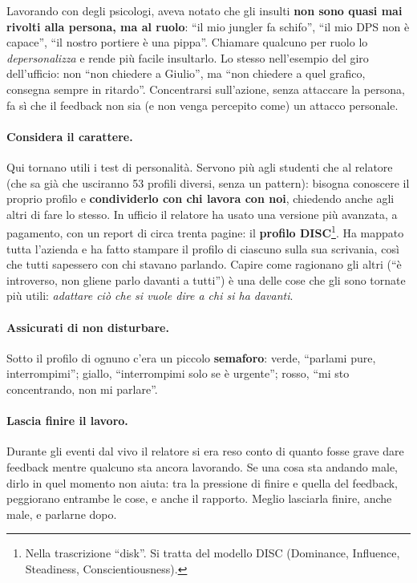 Lavorando con degli psicologi, aveva notato che gli insulti \textbf{non sono
quasi mai rivolti alla persona, ma al ruolo}: ``il mio jungler fa schifo'',
``il mio DPS non è capace'', ``il nostro portiere è una pippa''. Chiamare
qualcuno per ruolo lo \emph{depersonalizza} e rende più facile insultarlo. Lo
stesso nell'esempio del giro dell'ufficio: non ``non chiedere a Giulio'', ma
``non chiedere a quel grafico, consegna sempre in ritardo''. Concentrarsi
sull'azione, senza attaccare la persona, fa sì che il feedback non sia (e non
venga percepito come) un attacco personale.

\paragraph{Considera il carattere.} Qui tornano utili i test di personalità.
Servono più agli studenti che al relatore (che sa già che usciranno 53 profili
diversi, senza un pattern): bisogna conoscere il proprio profilo e
\textbf{condividerlo con chi lavora con noi}, chiedendo anche agli altri di
fare lo stesso. In ufficio il relatore ha usato una versione più avanzata, a
pagamento, con un report di circa trenta pagine: il \textbf{profilo
DISC}\footnote{Nella trascrizione ``disk''. Si tratta del modello DISC
(Dominance, Influence, Steadiness, Conscientiousness).}. Ha mappato tutta
l'azienda e ha fatto stampare il profilo di ciascuno sulla sua scrivania, così
che tutti sapessero con chi stavano parlando. Capire come ragionano gli altri
(``è introverso, non gliene parlo davanti a tutti'') è una delle cose che gli
sono tornate più utili: \emph{adattare ciò che si vuole dire a chi si ha
davanti}.

\paragraph{Assicurati di non disturbare.} Sotto il profilo di ognuno c'era un
piccolo \textbf{semaforo}: verde, ``parlami pure, interrompimi''; giallo,
``interrompimi solo se è urgente''; rosso, ``mi sto concentrando, non mi
parlare''.

\paragraph{Lascia finire il lavoro.} Durante gli eventi dal vivo il relatore si
era reso conto di quanto fosse grave dare feedback mentre qualcuno sta ancora
lavorando. Se una cosa sta andando male, dirlo in quel momento non aiuta: tra
la pressione di finire e quella del feedback, peggiorano entrambe le cose, e
anche il rapporto. Meglio lasciarla finire, anche male, e parlarne dopo.

